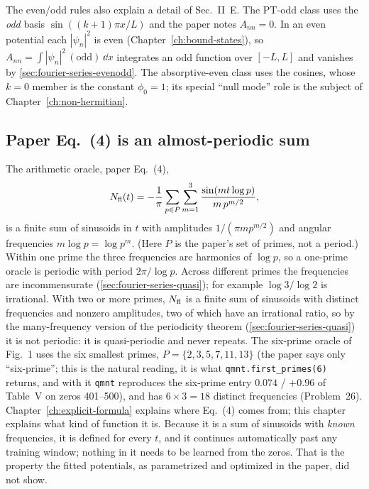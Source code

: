 The even/odd rules also explain a detail of Sec.~II~E. The PT-odd class uses the \emph{odd} basis $\sin((k+1)\pi x/L)$ and the paper notes $A_{nn}=0$. In an even potential each $|\psi_n|^2$ is even (Chapter~\ref{ch:bound-states}), so $A_{nn}=\int|\psi_n|^2\,(\text{odd})\,\dd x$ integrates an odd function over $[-L,L]$ and vanishes by \cref{sec:fourier-series-evenodd}. The absorptive-even class uses the cosines, whose $k=0$ member is the constant $\phi_0=1$; its special ``null mode'' role is the subject of Chapter~\ref{ch:non-hermitian}.

\subsection{Paper Eq.~(4) is an almost-periodic sum}

The arithmetic oracle, paper Eq.~(4),
\begin{equation}
N_{\mathrm{fl}}(t)=-\frac1\pi\sum_{p\in P}\sum_{m=1}^{3}\frac{\sin(mt\log p)}{m\,p^{m/2}},
\end{equation}
is a finite sum of sinusoids in $t$ with amplitudes $1/(\pi mp^{m/2})$ and angular frequencies $m\log p=\log p^m$. (Here $P$ is the paper's set of primes, not a period.) Within one prime the three frequencies are harmonics of $\log p$, so a one-prime oracle is periodic with period $2\pi/\log p$. Across different primes the frequencies are incommensurate (\cref{sec:fourier-series-quasi}); for example $\log3/\log2$ is irrational. With two or more primes, $N_{\mathrm{fl}}$ is a finite sum of sinusoids with distinct frequencies and nonzero amplitudes, two of which have an irrational ratio, so by the many-frequency version of the periodicity theorem (\cref{sec:fourier-series-quasi}) it is not periodic: it is quasi-periodic and never repeats. The six-prime oracle of Fig.~1 uses the six smallest primes, $P=\{2,3,5,7,11,13\}$ (the paper says only ``six-prime''; this is the natural reading, it is what \texttt{qmnt.first\_primes(6)} returns, and with it \texttt{qmnt} reproduces the six-prime entry $0.074$ / $+0.96$ of Table~V on zeros 401--500), and has $6\times3=18$ distinct frequencies (Problem~26). Chapter~\ref{ch:explicit-formula} explains where Eq.~(4) comes from; this chapter explains what kind of function it is. Because it is a sum of sinusoids with \emph{known} frequencies, it is defined for every $t$, and it continues automatically past any training window; nothing in it needs to be learned from the zeros. That is the property the fitted potentials, as parametrized and optimized in the paper, did not show.

